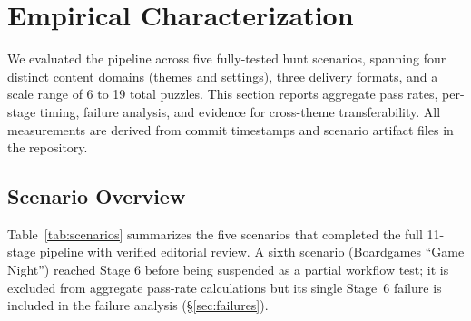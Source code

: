 \section{Empirical Characterization}
\label{sec:empirical}

We evaluated the pipeline across five fully-tested hunt scenarios, spanning four distinct content domains (themes and settings), three delivery formats, and a scale range of 6 to 19 total puzzles. This section reports aggregate pass rates, per-stage timing, failure analysis, and evidence for cross-theme transferability. All measurements are derived from commit timestamps and scenario artifact files in the repository.

\subsection{Scenario Overview}
\label{sec:scenarios}

Table~\ref{tab:scenarios} summarizes the five scenarios that completed the full 11-stage pipeline with verified editorial review. A sixth scenario (Boardgames ``Game Night'') reached Stage 6 before being suspended as a partial workflow test; it is excluded from aggregate pass-rate calculations but its single Stage~6 failure is included in the failure analysis (\S\ref{sec:failures}).

